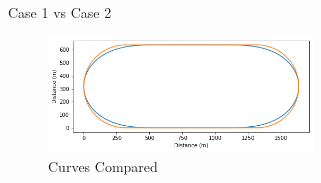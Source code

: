 \documentclass{beamer}
\begin{document}
\begin{frame}{Case 1 vs Case 2}
	\begin{figure}
		\caption{Curves Compared}
		\centering
		\includegraphics[width=70mm, scale=0.2]{circular_vs_euler_track.png}
	\end{figure}
	
\end{frame}

\begin{frame}
	
\end{frame}
\end{document}
